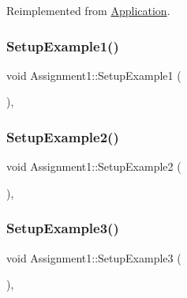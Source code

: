 Reimplemented from \hyperlink{class_application_ae6074c3f102de1cb2fe4c81b545679db}{Application}.

\hypertarget{class_assignment1_a07743a6d86f7603dd58339c4db1de192}{}\label{class_assignment1_a07743a6d86f7603dd58339c4db1de192}
\subsubsection{\texorpdfstring{Setup\+Example1()}{SetupExample1()}}
{\footnotesize\ttfamily void Assignment1\+::\+Setup\+Example1 (\begin{DoxyParamCaption}{ }\end{DoxyParamCaption})\hspace{0.3cm}{\ttfamily [private]}, {\ttfamily [virtual]}}

\hypertarget{class_assignment1_aeabed7b579d59a6fdacaeab468afba29}{}\label{class_assignment1_aeabed7b579d59a6fdacaeab468afba29}
\subsubsection{\texorpdfstring{Setup\+Example2()}{SetupExample2()}}
{\footnotesize\ttfamily void Assignment1\+::\+Setup\+Example2 (\begin{DoxyParamCaption}{ }\end{DoxyParamCaption})\hspace{0.3cm}{\ttfamily [private]}, {\ttfamily [virtual]}}

\hypertarget{class_assignment1_afbb3cb7765b899e69c9847d29f045392}{}\label{class_assignment1_afbb3cb7765b899e69c9847d29f045392}
\subsubsection{\texorpdfstring{Setup\+Example3()}{SetupExample3()}}
{\footnotesize\ttfamily void Assignment1\+::\+Setup\+Example3 (\begin{DoxyParamCaption}{ }\end{DoxyParamCaption})\hspace{0.3cm}{\ttfamily [private]}, {\ttfamily [virtual]}}

